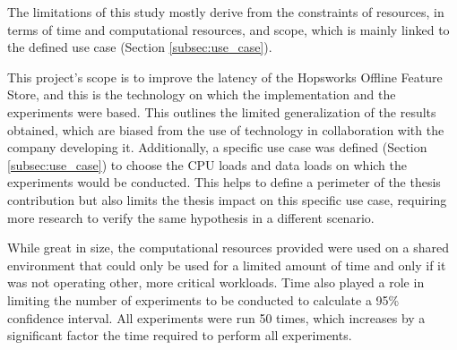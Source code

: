 The limitations of this study mostly derive from the constraints of resources, in terms of time and computational resources, and scope, which is mainly linked to the defined use case (Section \ref{subsec:use_case}). 

This project's scope is to improve the latency of the Hopsworks Offline Feature Store, and this is the technology on which the implementation and the experiments were based. This outlines the limited generalization of the results obtained, which are biased from the use of technology in collaboration with the company developing it. Additionally, a specific use case was defined (Section \ref{subsec:use_case}) to choose the \gls{CPU} loads and data loads on which the experiments would be conducted. This helps to define a perimeter of the thesis contribution but also limits the thesis impact on this specific use case, requiring more research to verify the same hypothesis in a different scenario.

While great in size, the computational resources provided were used on a shared environment that could only be used for a limited amount of time and only if it was not operating other, more critical workloads. Time also played a role in limiting the number of experiments to be conducted to calculate a 95\% confidence interval. All experiments were run 50 times, which increases by a significant factor the time required to perform all experiments. 